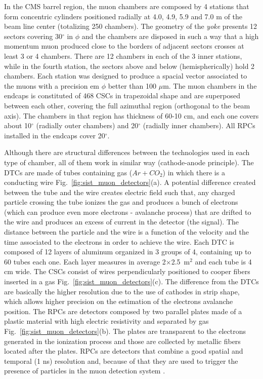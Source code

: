 In the CMS barrel region, the muon chambers are composed by 4 stations that form concentric cylinders positioned radially at 4.0, 4.9, 5.9 and 7.0 m of the beam line center (totalizing 250 chambers). The geometry of the \textit{yoke} presents 12 sectors covering 30$^{\circ}$ in \textbf{$\phi$} and the chambers are disposed in such a way that a high momentum muon produced close to the borders of adjacent sectors crosses at least 3 or 4 chambers. There are 12 chambers in each of the 3 inner stations, while in the fourth station, the sectors above and below (hemispherically) hold 2 chambers. Each station was designed to produce a spacial vector associated to the muons with a precision em \textbf{$\phi$} better than 100 $\mu$m. The muon chambers in the endcaps is constituted of 468 CSCs in trapezoidal shape and are superposed between each other, covering the full azimuthal region (orthogonal to the beam axis). The chambers in that region has thickness of 60-10 cm, and each one covers about 10$^{\circ}$ (radially outer chambers) and 20$^{\circ}$ (radially inner chambers). All RPCs installed in the endcaps cover 20$^{\circ}$.

Although there are structural differences between the technologies used in each type of chamber, all of them work in similar way (cathode-anode principle). The DTCs are made of tubes containing gas ($Ar+CO_2$) in which there is a conducting wire Fig.~\ref{fig:sist_muon_detectors}(a). A potential difference created between the tube and the wire creates electric field such that, any charged particle crossing the tube ionizes the gas and produces a bunch of electrons (which can produce even more electrons - avalanche process) that are drifted to the wire and produces an excess of current in the detector (the signal). The distance between the particle and the wire is a function of the velocity and the time associated to the electrons in order to achieve the wire. Each DTC is composed of 12 layers of aluminum organized in 3 groups of 4, containing up to 60 tubes each one. Each layer measures in average 2$\times$2.5~m$^{2}$ and each tube is 4 cm wide. The CSCs consist of wires perpendicularly positioned to cooper fibers inserted in a gas Fig.~\ref{fig:sist_muon_detectors}(c). The difference from the DTCs are basically the higher resolution due to the use of cathodes in strip shape, which allows higher precision on the estimation of the electrons avalanche position. The RPCs are detectors composed by two parallel plates made of a plastic material with high electric resistivity and separated by gas Fig.~\ref{fig:sist_muon_detectors}(b). The plates are transparent to the electrons generated in the ionization process and those are collected by metallic fibers located after the plates. RPCs are detectors that combine a good spatial and temporal (1 ns) resolution and, because of that they are used to trigger the presence of particles in the muon detection system \cite{bib:CMS-PTDR-2006,bib:CMS-MSTDR-1997,bib:grupen-2008}.

